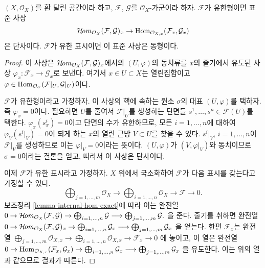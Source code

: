 \begin{lemma}
\label{lemma-stalk-internal-hom}
$(X, \mathcal{O}_X)$를 환 달린 공간이라 하고,
$\mathcal{F}$, $\mathcal{G}$를 $\mathcal{O}_X$-가군이라 하자.
$\mathcal{F}$가 유한형이면 표준 사상
$$
\mathop{\mathcal{H}\!\mathit{om}}\nolimits_{\mathcal{O}_X}(\mathcal{F}, \mathcal{G})_x
\to
\mathop{\mathrm{Hom}}\nolimits_{\mathcal{O}_{X, x}}(\mathcal{F}_x, \mathcal{G}_x)
$$
은 단사이다. $\mathcal{F}$가 유한 표시이면 이 표준 사상은 동형이다.
\end{lemma}

\begin{proof}
이 사상은 $\mathop{\mathcal{H}\!\mathit{om}}\nolimits_{\mathcal{O}_X}(\mathcal{F}, \mathcal{G})_x$에서의
$(U, \varphi)$의 동치류를 $x$의 줄기에서 유도된 사상
$\varphi_x : \mathcal{F}_x \to \mathcal{G}_x$로 보낸다. 여기서
$x \in U \subset X$는 열린집합이고
$\varphi \in \mathop{\mathrm{Hom}}\nolimits_{\mathcal{O}_U}(\mathcal{F}|_U, \mathcal{G}|_U)$이다.

\medskip\noindent
$\mathcal{F}$가 유한형이라고 가정하자. 이 사상의 핵에 속하는 원소
$\sigma$의 대표 $(U, \varphi)$를 택하자. 즉 $\varphi_x = 0$이다.
필요하면 $U$를 줄여서 $\mathcal{F}|_U$를 생성하는 단면들
$s^1, \ldots, s^n \in \mathcal{F}(U)$를 택한다.
$\varphi_x(s^i_x) = 0$이고 단면의 수가 유한하므로, 모든
$i = 1, \ldots, n$에 대하여 $\varphi_V(s^i|_V)=0$이 되게 하는
$x$의 열린 근방 $V \subset U$를 찾을 수 있다. $s^i|_V$,
$i = 1, \ldots, n$이 $\mathcal{F}|_V$를 생성하므로 이는
$\varphi|_V = 0$이라는 뜻이다. $(U, \varphi)$가
$(V, \varphi|_V)$와 동치이므로 $\sigma = 0$이라는 결론을 얻고,
따라서 이 사상은 단사이다.

\medskip\noindent
이제 $\mathcal{F}$가 유한 표시라고 가정하자. $X$ 위에서 국소화하여
$\mathcal{F}$가 다음 표시를 갖는다고 가정할 수 있다.
$$
\bigoplus\nolimits_{j = 1, \ldots, m}
\mathcal{O}_X
\longrightarrow
\bigoplus\nolimits_{i = 1, \ldots, n}
\mathcal{O}_X
\to
\mathcal{F}
\to
0.
$$
보조정리 \ref{lemma-internal-hom-exact}에 따라 이는 완전열
$
0 \to
\mathop{\mathcal{H}\!\mathit{om}}\nolimits_{\mathcal{O}_X}(\mathcal{F}, \mathcal{G}) \to
\bigoplus\nolimits_{i = 1, \ldots, n} \mathcal{G}
\longrightarrow
\bigoplus\nolimits_{j = 1, \ldots, m} \mathcal{G}.
$
을 준다. 줄기를 취하면 완전열
$
0 \to
\mathop{\mathcal{H}\!\mathit{om}}\nolimits_{\mathcal{O}_X}(\mathcal{F}, \mathcal{G})_x \to
\bigoplus\nolimits_{i = 1, \ldots, n} \mathcal{G}_x
\longrightarrow
\bigoplus\nolimits_{j = 1, \ldots, m} \mathcal{G}_x
$
을 얻는다. 한편 $\mathcal{F}_x$는 완전열
$
\bigoplus\nolimits_{j = 1, \ldots, m}
\mathcal{O}_{X, x}
\longrightarrow
\bigoplus\nolimits_{i = 1, \ldots, n}
\mathcal{O}_{X, x}
\to
\mathcal{F}_x
\to
0
$
에 놓이고, 이 열은 완전열
$
0 \to
\mathop{\mathrm{Hom}}\nolimits_{\mathcal{O}_{X, x}}(\mathcal{F}_x, \mathcal{G}_x) \to
\bigoplus\nolimits_{i = 1, \ldots, n} \mathcal{G}_x
\longrightarrow
\bigoplus\nolimits_{j = 1, \ldots, m} \mathcal{G}_x
$
을 유도한다. 이는 위의 열과 같으므로 결과가 따른다.
\end{proof}

